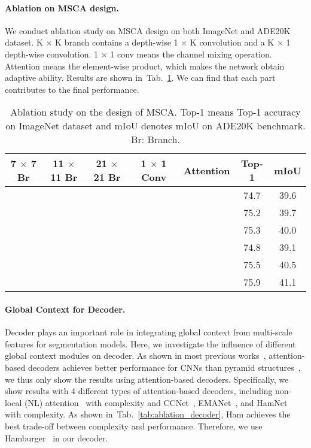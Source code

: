 \documentclass{article}
\newcommand{\cmark}{\ding{51}}\newcommand{\xmark}{\text{\ding{55}}}
\newcommand{\tabref}[1]{Tab.~\ref{#1}}
\begin{document}
\paragraph{Ablation on MSCA design.}
We conduct ablation study on MSCA design on both ImageNet and ADE20K dataset.
K $\times$ K branch contains a depth-wise 1 $\times$ K convolution and a K $\times$ 1 depth-wise convolution.
1 $\times$ 1 conv means the channel mixing operation.
Attention means the element-wise product,
which makes the network obtain adaptive ability.
Results are shown in~\tabref{Tab.ablation_msca}.  
We can find that each part contributes to the final performance.

\begin{table}[htp!]
  \centering
  \setlength{\tabcolsep}{2.6mm}
  \caption{Ablation study on the design of MSCA. Top-1 means Top-1 accuracy on ImageNet dataset and mIoU denotes mIoU on ADE20K benchmark. Br: Branch.}
  \begin{tabular}{c|c|c|c|c|c|c}
    \toprule
    \textbf{7 $\times$ 7 Br} & \textbf{11 $\times$ 11 Br} & \textbf{21 $\times$ 21 Br} & \textbf{1 $\times$ 1 Conv}  
      & \textbf{Attention} &  \textbf{Top-1} &  \textbf{mIoU} \\ \midrule
       \cmark   & \xmark & \xmark & \cmark & \cmark & 74.7 & 39.6 \\ 
       \xmark   & \cmark & \xmark & \cmark & \cmark & 75.2 & 39.7 \\ 
       \xmark   & \xmark & \cmark & \cmark & \cmark & 75.3 & 40.0 \\ 
       \cmark   & \cmark & \cmark & \xmark & \cmark & 74.8 & 39.1 \\ 
       \cmark   & \cmark & \cmark & \cmark & \xmark & 75.5 & 40.5 \\ 
       \cmark   & \cmark & \cmark & \cmark & \cmark & 75.9 & 41.1 \\ 
    \bottomrule
  \end{tabular}
  \label{Tab.ablation_msca}
\end{table}



\paragraph{Global Context for Decoder.} 
Decoder plays an important role in integrating global context from multi-scale features for segmentation models.
Here, we investigate the influence of different global context modules on decoder.
As shown in most previous works~\cite{wang2018non,fu2019dual}, attention-based
decoders achieves better performance for CNNs than pyramid structures~\cite{zhao2017pyramid,chen2017deeplab}, we thus only show the results using attention-based decoders.
Specifically, we show results with 4 different types of attention-based decoders,
including non-local (NL) attention~\cite{wang2018non} with  complexity
and CCNet~\cite{huang2019ccnet}, EMANet~\cite{li2019expectation}, and HamNet~\cite{geng2021attention} with  complexity.
As shown in~\tabref{tab:ablation_decoder}, Ham achieves the best trade-off between complexity and performance.
Therefore, we use Hamburger~\cite{geng2021attention} in our decoder.
\end{document}
